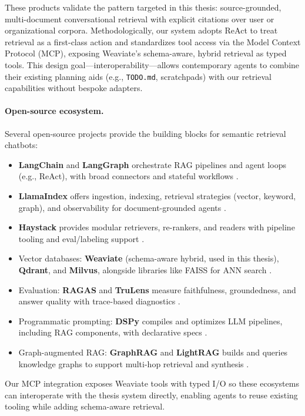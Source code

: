 These products validate the pattern targeted in this thesis: source-grounded, multi-document conversational retrieval with explicit citations over user or organizational corpora. Methodologically, our system adopts ReAct to treat retrieval as a first-class action and standardizes tool access via the Model Context Protocol (MCP), exposing Weaviate's schema-aware, hybrid retrieval as typed tools. This design goal—interoperability—allows contemporary agents to combine their existing planning aids (e.g., \texttt{TODO.md}, scratchpads) with our retrieval capabilities without bespoke adapters.

\paragraph{Open-source ecosystem.} Several open-source projects provide the building blocks for semantic retrieval chatbots:
\begin{itemize}
    \item \textbf{LangChain} and \textbf{LangGraph} orchestrate RAG pipelines and agent loops (e.g., ReAct), with broad connectors and stateful workflows \cite{langchain,langgraph}.
    \item \textbf{LlamaIndex} offers ingestion, indexing, retrieval strategies (vector, keyword, graph), and observability for document-grounded agents \cite{llamaindex}.
    \item \textbf{Haystack} provides modular retrievers, re-rankers, and readers with pipeline tooling and eval/labeling support \cite{haystack}.
    \item Vector databases: \textbf{Weaviate} (schema-aware hybrid, used in this thesis), \textbf{Qdrant}, and \textbf{Milvus}, alongside libraries like FAISS for ANN search \cite{weaviate,qdrant,milvus,douze2024faiss}.
    \item Evaluation: \textbf{RAGAS} and \textbf{TruLens} measure faithfulness, groundedness, and answer quality with trace-based diagnostics \cite{ragas,trulens}.
    \item Programmatic prompting: \textbf{DSPy} compiles and optimizes LLM pipelines, including RAG components, with declarative specs \cite{dspy}.
    \item Graph-augmented RAG: \textbf{GraphRAG} and \textbf{LightRAG} builds and queries knowledge graphs to support multi-hop retrieval and synthesis \cite{graphrag}.
\end{itemize}

Our MCP integration exposes Weaviate tools with typed I/O so these ecosystems can interoperate with the thesis system directly, enabling agents to reuse existing tooling while adding schema-aware retrieval.

